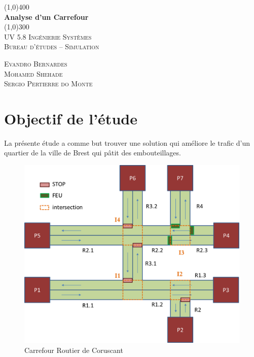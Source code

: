 \documentclass[12pt]{article} %
\begin{document}
\begin{titlepage}
	\begin{center}
	\line(1,0){400} \\
	[0.25in]
	\huge{\bfseries Analyse d'un Carrefour} \\
	[2mm]
	\line(1,0){300} \\
	[1.5cm]
	\textsc{\LARGE UV 5.8 Ingénierie Systèmes} \\
	[0.75cm]
	\textsc{\Large Bureau d'études – Simulation} \\
	[10cm]
	\end{center}
	\begin{flushright}
	\textsc{\large Evandro Bernardes \\ Mohamed Shehade \\ Sergio Pertierre do Monte  \\}
	\end{flushright}

\end{titlepage}

\tableofcontents
\thispagestyle{empty}
\cleardoublepage


\listoffigures
\cleardoublepage

\setcounter{page}{1}

\section{Objectif de l'étude}\label{sec:1}
La présente étude a comme but trouver une solution qui améliore le trafic d'un quartier de la ville de Brest qui pâtit des embouteillages.

\begin{figure}[H]
	\centering
	\includegraphics[width=\linewidth]{Figure1.png}
	\caption{Carrefour Routier de Coruscant}
	\label{fig:fig1}
\end{figure}
\end{document}
